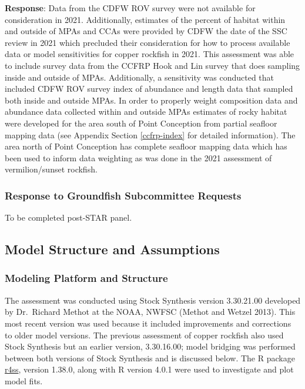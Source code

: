 \documentclass[11pt,
  english,
  letterpaper,
]{article}
\begin{document}
\textbf{Response}: Data from the CDFW ROV survey were not available for consideration in 2021. Additionally, estimates of the percent of habitat within and outside of MPAs and CCAs were provided by CDFW the date of the SSC review in 2021 which precluded their consideration for how to process available data or model sensitivities for copper rockfish in 2021. This assessment was able to include survey data from the CCFRP Hook and Lin survey that does sampling inside and outside of MPAs. Additionally, a sensitivity was conducted that included CDFW ROV survey index of abundance and length data that sampled both inside and outside MPAs. In order to properly weight composition data and abundance data collected within and outside MPAs estimates of rocky habitat were developed for the area south of Point Conception from partial seafloor mapping data (see Appendix Section \ref{ccfrp-index} for detailed information). The area north of Point Conception has complete seafloor mapping data which has been used to inform data weighting as was done in the 2021 assessment of vermilion/sunset rockfish.

\hypertarget{response-to-groundfish-subcommittee-requests}{%
\subsubsection{Response to Groundfish Subcommittee Requests}\label{response-to-groundfish-subcommittee-requests}}

To be completed post-STAR panel.

\hypertarget{model-structure-and-assumptions}{%
\subsection{Model Structure and Assumptions}\label{model-structure-and-assumptions}}

\hypertarget{modeling-platform-and-structure}{%
\subsubsection{Modeling Platform and Structure}\label{modeling-platform-and-structure}}

The assessment was conducted using Stock Synthesis version 3.30.21.00 developed by Dr.~Richard Methot at the NOAA, NWFSC (Methot and Wetzel 2013). This most recent version was used because it included improvements and corrections to older model versions. The previous assessment of copper rockfish also used Stock Synthesis but an earlier version, 3.30.16.00; model bridging was performed between both versions of Stock Synthesis and is discussed below. The R package \href{https://github.com/r4ss/r4ss}{r4ss}, version 1.38.0, along with R version 4.0.1 were used to investigate and plot model fits.
\end{document}
